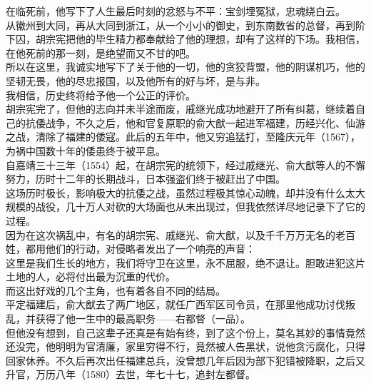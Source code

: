 \begin{multicols}{\theparacolNo}
在临死前，他写下了人生最后时刻的忿怒与不平：宝剑埋冤狱，忠魂绕白云。\\

从徽州到大同，再从大同到浙江，从一个小小的御史，到东南数省的总督，再到阶下囚，胡宗宪把他的毕生精力都奉献给了他的理想，却有了这样的下场。我相信，在他死前的那一刻，是绝望而又不甘的吧。\\

所以在这里，我诚实地写下了关于他的一切，他的贪狡背盟，他的阴谋机巧，他的坚韧无畏，他的尽忠报国，以及他所有的好与坏，是与非。\\

我相信，历史终将给予他一个公正的评价。\\

胡宗宪完了，但他的志向并未半途而废，戚继光成功地避开了所有纠葛，继续着自己的抗倭战争，不久之后，他和官复原职的俞大猷一起进军福建，历经兴化、仙游之战，清除了福建的倭寇。此后的五年中，他又穷追猛打，至隆庆元年（1567），为祸中国数十年的倭患终于被平息。\\

自嘉靖三十三年（1554）起，在胡宗宪的统领下，经过戚继光、俞大猷等人的不懈努力，历时十二年的长期战斗，日本强盗们终于被赶出了中国。\\

这场历时极长，影响极大的抗倭之战，虽然过程极其惊心动魄，却并没有什么太大规模的战役，几十万人对砍的大场面也从未出现过，但我依然详尽地记录下了它的过程。\\

因为在这次祸乱中，有名的胡宗宪、戚继光、俞大猷，以及千千万万无名的老百姓，都用他们的行动，对侵略者发出了一个响亮的声音：\\

这里是我们生长的地方，我们将守卫在这里，永不屈服，绝不退让。胆敢进犯这片土地的人，必将付出最为沉重的代价。\\

而这出好戏的几个主角，也有着各自不同的结局。\\

平定福建后，俞大猷去了两广地区，就任广西军区司令员，在那里他成功讨伐叛乱，并获得了他一生中的最高职务——右都督（一品）。\\

但他没有想到，自己这辈子还真是有始有终，到了这个份上，莫名其妙的事情竟然还没完，他明明为官清廉，家里穷得不行，竟然被人告黑状，说他贪污腐化，只得回家休养。不久后再次出任福建总兵，没曾想几年后因为部下犯错被降职，之后又升官，万历八年（1580）去世，年七十七，追封左都督。\\


\end{multicols}
